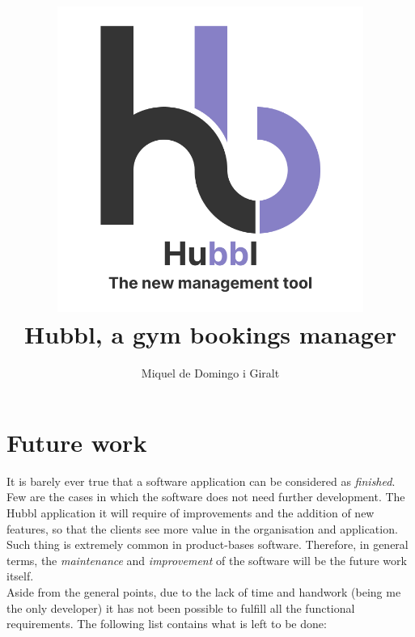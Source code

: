 \documentclass[a4paper, 12pt, oneside]{book}
\title{
	\includegraphics[width=0.75\textwidth]{assets/logo.png}
	\\
	{\huge Hubbl, a gym bookings manager}
}
\author{Miquel de Domingo i Giralt}
\begin{document}
\frontmatter
\maketitle
\mainmatter
\chapter{Future work}
It is barely ever true that a software application can be considered as \emph{finished}. Few are the cases in which the software does not need further development. The Hubbl application it will require of improvements and the addition of new features, so that the clients see more value in the organisation and application. Such thing is extremely common in product-bases software. Therefore, in general terms, the \emph{maintenance} and \emph{improvement} of the software will be the future work itself.
\\[8pt]
Aside from the general points, due to the lack of time and handwork (being me the only developer) it has not been possible to fulfill all the functional requirements. The following list contains what is left to be done:
\end{document}
